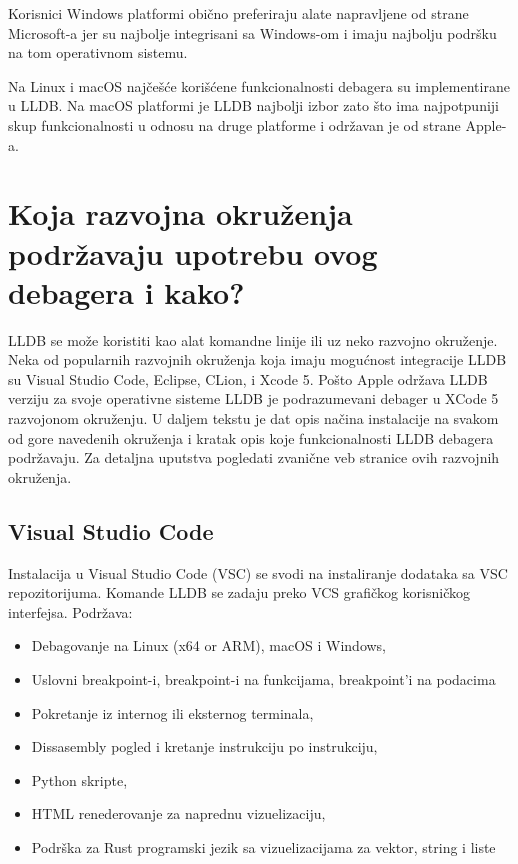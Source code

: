 \documentclass[a4paper]{article}
\begin{document}
Korisnici Windows platformi obično preferiraju alate napravljene od strane Microsoft-a jer su najbolje integrisani sa Windows-om i imaju najbolju podršku na tom operativnom sistemu.

Na Linux i macOS najčešće korišćene funkcionalnosti debagera su implementirane u LLDB. Na macOS platformi je LLDB najbolji izbor zato što ima najpotpuniji skup funkcionalnosti u odnosu na druge platforme i održavan je od strane Apple-a.

\section{Koja razvojna okruženja podržavaju upotrebu ovog debagera i kako?}
\label{sec:Koja razvojna okruzenja podrzavaju upotrebu ovog debagera i kako?}

LLDB se može koristiti kao alat komandne linije ili uz neko razvojno okruženje. Neka od popularnih razvojnih okruženja koja imaju mogućnost integracije LLDB su Visual Studio Code, Eclipse, CLion, i Xcode 5. Pošto Apple održava LLDB verziju za svoje operativne sisteme LLDB je podrazumevani debager u XCode 5 razvojonom okruženju. 
U daljem tekstu je dat opis načina instalacije na svakom od gore navedenih okruženja i kratak opis koje funkcionalnosti LLDB debagera podržavaju. Za detaljna uputstva pogledati zvanične veb stranice ovih razvojnih okruženja.

\subsection{Visual Studio Code}
Instalacija u Visual Studio Code (VSC) se svodi na instaliranje dodataka sa VSC repozitorijuma\cite{visual_code_plugin}. Komande LLDB se zadaju preko VCS grafičkog korisničkog interfejsa. 
Podržava:
\begin{itemize}
\item Debagovanje na Linux (x64 or ARM), macOS i Windows,
\item Uslovni breakpoint-i, breakpoint-i na funkcijama, breakpoint'i na podacima
\item Pokretanje iz internog ili eksternog terminala,
\item Dissasembly pogled i kretanje instrukciju po instrukciju,
\item Python skripte,
\item HTML renederovanje za naprednu vizuelizaciju,
\item Podrška za Rust programski jezik sa vizuelizacijama za vektor, string i liste
\end{itemize}
\end{document}
